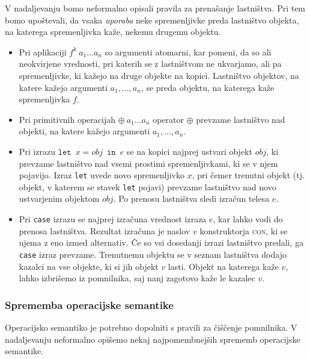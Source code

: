 V nadaljevanju bomo neformalno opisali pravila za prenašanje lastništva. Pri tem bomo upoštevali, da vsaka \emph{uporaba} neke spremenljivke preda lastništvo objekta, na katerega spremenljivka kaže, nekemu drugemu objektu.

\begin{itemize}
    \itemsep 0em
    \item Pri aplikaciji $f^k \: a_1 \dots a_n$ so argumenti atomarni, kar pomeni, da so ali neokvirjene vrednosti, pri katerih se z lastništvom ne ukvarjamo, ali pa spremenljivke, ki kažejo na druge objekte na kopici. Lastništvo objektov, na katere kažejo argumenti $a_1, \dots, a_n$, se preda objektu, na katerega kaže spremenljivka $f$.
    \item Pri primitivnih operacijah $\oplus \: a_1 \dots a_n$ operator $\oplus$ prevzame lastništvo nad objekti, na katere kažejo argumenti $a_1, \dots, a_n$.
    \item Pri izrazu $\texttt{let} \enspace x = obj \enspace \texttt{in} \enspace e$ se na kopici najprej ustvari objekt $obj$, ki prevzame lastništvo nad vsemi prostimi spremenljivkami, ki se v njem pojavijo. Izraz \texttt{let} uvede novo spremenljivko $x$, pri čemer trenutni objekt (tj. objekt, v katerem se stavek \texttt{let} pojavi) prevzame lastništvo nad novo ustvarjenim objektom $obj$. Po prenosu lastništva sledi izračun telesa $e$.
    \item Pri \texttt{case} izrazu se najprej izračuna vrednost izraza $e$, kar lahko vodi do prenosa lastništva. Rezultat izračuna je naslov $v$ konstruktorja \textsc{con}, ki se ujema z eno izmed alternativ. Če so vsi dosedanji izrazi lastništvo predali, ga \texttt{case} izraz prevzame. Trenutnemu objektu se v seznam lastništva dodajo kazalci na vse objekte, ki si jih objekt $v$ lasti. Objekt na katerega kaže $v$, lahko izbrišemo iz pomnilnika, saj nanj zagotovo kaže le kazalec $v$.
\end{itemize}

\subsubsection{Sprememba operacijske semantike}

Operacijsko semantiko je potrebno dopolniti s pravili za čiščenje pomnilnika. V nadaljevanju neformalno opišemo nekaj najpomembnejših sprememb operacijske semantike.

